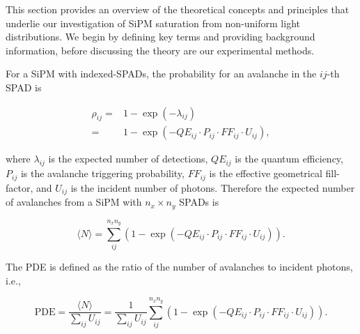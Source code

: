 \documentclass[main.tex]{subfiles} %
\begin{document}
\doublespacing
\thispagestyle{empty}


This section provides an overview of the theoretical concepts and principles that underlie our investigation of SiPM saturation from non-uniform light distributions. We begin by defining key terms and providing background information, before discussing the theory are our experimental methods. 

For a SiPM with indexed-SPADs, the probability for an avalanche in the $ij$-th SPAD is 

\begin{align}\label{eq:pdp}
    \rho_{ij} =& 1 - \exp{\left(- \lambda_{ij} \right)}\\
     =& 1 - \exp{\left(- QE_{ij} \cdot P_{ij} \cdot FF_{ij} \cdot U_{ij}\right)},
\end{align}

where $\lambda_{ij}$ is the expected number of detections, $QE_{ij}$ is the quantum efficiency, $P_{ij}$ is the avalanche triggering probability, $FF_{ij}$ is the effective geometrical fill-factor, and $U_{ij}$ is the incident number of photons. Therefore the expected number of avalanches from a SiPM with $n_x \times n_y$ SPADs is 

\begin{equation}\label{eq:nf-exact}
    \langle N \rangle = \sum_{ij}^{n_x n_y} \left(  1 - \exp{\left(  - QE_{ij} \cdot P_{ij} \cdot FF_{ij} \cdot U_{ij}\right)} \right).
\end{equation}

The PDE is defined as the ratio of the number of avalanches to incident photons, i.e.,

\begin{equation}\label{eq:pde-eff}
    \text{PDE} = \frac{\langle N \rangle}{\sum_{ij} U_{ij}} = \frac{1}{\sum_{ij} U_{ij}}\sum_{ij}^{n_x n_y} \left(  1 - \exp{\left(  - QE_{ij} \cdot P_{ij} \cdot FF_{ij} \cdot U_{ij}\right)} \right).
\end{equation}
\end{document}
